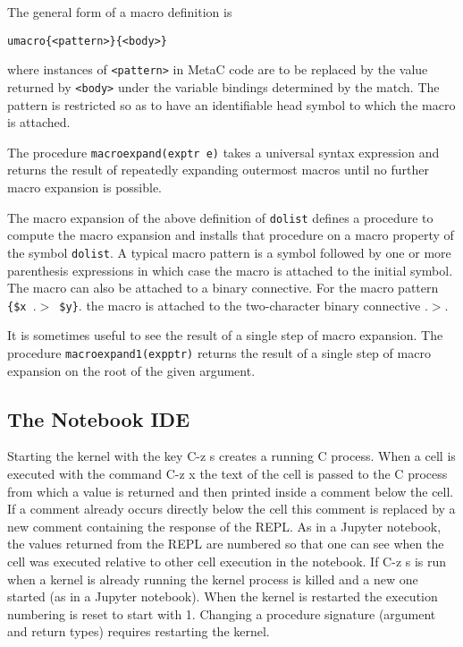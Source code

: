 \documentclass{article}
\begin{document}
The general form of a macro definition is
\begin{verbatim}
umacro{<pattern>}{<body>}
\end{verbatim}
where instances of {\tt <pattern>} in MetaC code are to be replaced by
the value returned by {\tt <body>} under the variable bindings
determined by the match.  The pattern is restricted so as to have
an identifiable head symbol to which the macro is attached.

The procedure {\tt macroexpand(exptr e)} takes a
universal syntax expression and returns the result of repeatedly
expanding outermost macros until no further macro expansion is
possible.

The macro expansion of the above definition of {\tt dolist}
defines a procedure
to compute the macro expansion and installs that procedure on a macro
property of the symbol {\tt dolist}.  A typical macro pattern
is a symbol followed by one or more parenthesis
expressions in which case the macro is attached to the initial symbol.
The macro can also be attached to a binary connective.
For the macro pattern {\tt \{\$x $.\!>$ \$y\}}.
the macro is attached to the two-character binary connective $.\!>$.

It is sometimes useful to see the result of a single step
of macro expansion. The procedure {\tt macroexpand1(expptr)} returns
the result of a single step of macro expansion on the root of the given argument.

\subsection{The Notebook IDE}
\label{sec:Emacs}

Starting the kernel with the key C-z s creates a running C process.  When a cell is executed
with the command C-z x the text of the cell is passed to the C process from which a value is returned
and then printed inside a comment below the cell.  If a comment already occurs directly below the cell this
comment is replaced by a new comment containing the response of the REPL.  As in a Jupyter notebook,
the values returned from the REPL are numbered so that one can see when the cell was executed
relative to other cell execution in the notebook.  If C-z s is run when a kernel is already running
the kernel process is killed and a new one started (as in a Jupyter notebook).  When the kernel is
restarted the execution numbering is reset to start with 1.  Changing a procedure signature
(argument and return types) requires restarting the kernel.
\end{document}
